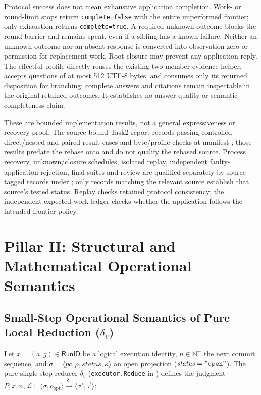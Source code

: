 \documentclass[11pt,a4paper]{article}
\theoremstyle{definition}
\theoremstyle{remark}
\newcommand{\RunID}{\mathsf{RunID}}
\begin{document}
Protocol success does not mean exhaustive application completion. Work- or round-limit stops return \texttt{complete=false} with the entire unperformed frontier; only exhaustion returns \texttt{complete=true}. A required unknown outcome blocks the round barrier and remains spent, even if a sibling has a known failure. Neither an unknown outcome nor an absent response is converted into observation zero or permission for replacement work. Root closure may prevent any application reply. The effectful profile directly reuses the existing two-member evidence helper, accepts questions of at most 512 UTF-8 bytes, and consumes only its returned disposition for branching; complete answers and citations remain inspectable in the original retained outcomes. It establishes no answer-quality or semantic-completeness claim.

These are bounded implementation results, not a general expressiveness or recovery proof. The source-bound Task2 report records passing controlled direct/nested and paired-result cases and byte/profile checks at manifest ; those results predate the rebase onto  and do not qualify the rebased source. Process recovery, unknown/closure schedules, isolated replay, independent faulty-application rejection, final suites and review are qualified separately by source-tagged records under ; only records matching the relevant source establish that source's tested status. Replay checks retained protocol consistency; the independent expected-work ledger checks whether the application follows the intended frontier policy.

\section{Pillar II: Structural and Mathematical Operational Semantics}

\subsection{Small-Step Operational Semantics of Pure Local Reduction (\texorpdfstring{$\delta_v$}{delta\_v})}
Let $x = (a, g) \in \RunID$ be a logical execution identity, $n \in \mathbb{N}^+$ the next commit sequence, and $\sigma = \langle \mathit{pc}, \rho, \mathit{status}, \kappa \rangle$ an open projection ($\mathit{status} = \mathtt{"open"}$). The pure single-step reducer $\delta_v$ (\texttt{executor.Reduce} in ) defines the judgment $P, x, n, \mathcal{L} \vdash \langle \sigma, o_{\text{opt}} \rangle \xrightarrow{\delta_v} \langle \sigma', \vec{\iota} \rangle$:
\end{document}
